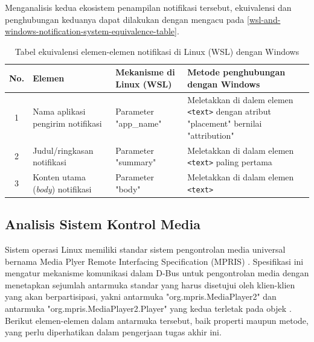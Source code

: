 Menganalisis kedua ekosistem penampilan notifikasi tersebut, ekuivalensi dan penghubungan keduanya dapat dilakukan dengan mengacu pada \autoref{wsl-and-windows-notification-system-equivalence-table}.

\begin{table}[h]
    \centering
    \caption{Tabel ekuivalensi elemen-elemen notifikasi di Linux (WSL) dengan Windows}
    \label{wsl-and-windows-notification-system-equivalence-table}
    \begin{tabularx}{\textwidth}{|c|p{3cm}|X|X|} \hline
        \textbf{No.} & \textbf{Elemen} & \textbf{Mekanisme di Linux (WSL)} & \textbf{Metode penghubungan dengan Windows}\\ \hline
        1 & Nama aplikasi pengirim notifikasi & Parameter "app\_name" & Meletakkan di dalem elemen \verb|<text>| dengan atribut "placement" bernilai "attribution"\\ \hline
        2 & Judul/ringkasan notifikasi & Parameter "summary" & Meletakkan di dalam elemen \verb|<text>| paling pertama\\ \hline
        3 & Konten utama (\textit{body}) notifikasi & Parameter "body" & Meletakkan di dalam elemen \verb|<text>|\\ \hline
    \end{tabularx}
\end{table}

\subsection{Analisis Sistem Kontrol Media}

Sistem operasi Linux memiliki standar sistem pengontrolan media universal bernama Media Plyer Remote Interfacing Specification (MPRIS) \cite{xdg-mpris-specification}. Spesifikasi ini mengatur mekanisme komunikasi dalam D-Bus untuk pengontrolan media dengan menetapkan sejumlah antarmuka standar yang harus disetujui oleh klien-klien yang akan berpartisipasi, yakni antarmuka "org.mpris.MediaPlayer2" dan antarmuka "org.mpris.MediaPlayer2.Player" yang kedua terletak pada objek . Berikut elemen-elemen dalam antarmuka tersebut, baik properti maupun metode, yang perlu diperhatikan dalam pengerjaan tugas akhir ini.

